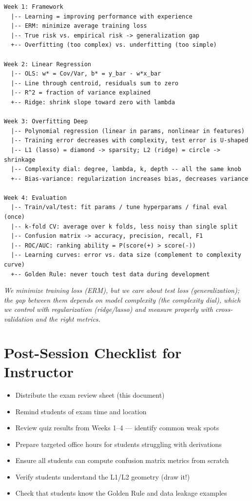 \documentclass[11pt,a4paper]{article}
\begin{document}
\begin{verbatim}
Week 1: Framework
  |-- Learning = improving performance with experience
  |-- ERM: minimize average training loss
  |-- True risk vs. empirical risk -> generalization gap
  +-- Overfitting (too complex) vs. underfitting (too simple)

Week 2: Linear Regression
  |-- OLS: w* = Cov/Var, b* = y_bar - w*x_bar
  |-- Line through centroid, residuals sum to zero
  |-- R^2 = fraction of variance explained
  +-- Ridge: shrink slope toward zero with lambda

Week 3: Overfitting Deep
  |-- Polynomial regression (linear in params, nonlinear in features)
  |-- Training error decreases with complexity, test error is U-shaped
  |-- L1 (lasso) = diamond -> sparsity; L2 (ridge) = circle -> shrinkage
  |-- Complexity dial: degree, lambda, k, depth -- all the same knob
  +-- Bias-variance: regularization increases bias, decreases variance

Week 4: Evaluation
  |-- Train/val/test: fit params / tune hyperparams / final eval (once)
  |-- k-fold CV: average over k folds, less noisy than single split
  |-- Confusion matrix -> accuracy, precision, recall, F1
  |-- ROC/AUC: ranking ability = P(score(+) > score(-))
  |-- Learning curves: error vs. data size (complement to complexity curve)
  +-- Golden Rule: never touch test data during development
\end{verbatim}

\bigskip

\begin{tcolorbox}[colback=green!5,colframe=green!50,title=The One Sentence That Connects Everything]
\emph{We minimize training loss (ERM), but we care about test loss (generalization); the gap between them depends on model complexity (the complexity dial), which we control with regularization (ridge/lasso) and measure properly with cross-validation and the right metrics.}
\end{tcolorbox}

\bigskip

\section*{Post-Session Checklist for Instructor}

\begin{itemize}
    \item[$\square$] Distribute the exam review sheet (this document)
    \item[$\square$] Remind students of exam time and location
    \item[$\square$] Review quiz results from Weeks 1--4 --- identify common weak spots
    \item[$\square$] Prepare targeted office hours for students struggling with derivations
    \item[$\square$] Ensure all students can compute confusion matrix metrics from scratch
    \item[$\square$] Verify students understand the L1/L2 geometry (draw it!)
    \item[$\square$] Check that students know the Golden Rule and data leakage examples
\end{itemize}
\end{document}
